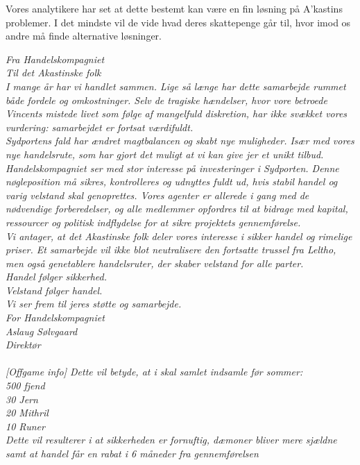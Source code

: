 \documentclass[letterpaper,12pt]{memoir}
\newenvironment{pullquote}
  {\begin{tcolorbox}[enhanced, breakable]\itshape\large}
  {\end{tcolorbox}}
\begin{document}
Vores analytikere har set at dette bestemt kan være en fin løsning på A'kastins problemer. I det mindste vil de vide hvad deres skattepenge går til, hvor imod os andre må finde alternative løsninger.

\begin{pullquote}
Fra Handelskompagniet\\
Til det Akastinske folk\\
I mange år har vi handlet sammen. Lige så længe har dette samarbejde rummet både fordele og omkostninger. Selv de tragiske hændelser, hvor vore betroede Vincents mistede livet som følge af mangelfuld diskretion, har ikke svækket vores vurdering: samarbejdet er fortsat værdifuldt.\\
Sydportens fald har ændret magtbalancen og skabt nye muligheder. Især med vores nye handelsrute, som har gjort det muligt at vi kan give jer et unikt tilbud.\\
Handelskompagniet ser med stor interesse på investeringer i Sydporten. Denne nøgleposition må sikres, kontrolleres og udnyttes fuldt ud, hvis stabil handel og varig velstand skal genoprettes. Vores agenter er allerede i gang med de nødvendige forberedelser, og alle medlemmer opfordres til at bidrage med kapital, ressourcer og politisk indflydelse for at sikre projektets gennemførelse.\\
Vi antager, at det Akastinske folk deler vores interesse i sikker handel og rimelige priser. Et samarbejde vil ikke blot neutralisere den fortsatte trussel fra Leltho, men også genetablere handelsruter, der skaber velstand for alle parter.\\
Handel følger sikkerhed.\\
Velstand følger handel.\\
Vi ser frem til jeres støtte og samarbejde.\\
For Handelskompagniet\\
 Aslaug Sølvgaard\\
 Direktør\\\\[3\baselineskip]
[Offgame info] Dette vil betyde, at i skal samlet indsamle før sommer: \\
500 fjend \\
30 Jern \\
20 Mithril \\
10 Runer \\
Dette vil resulterer i at sikkerheden er fornuftig, dæmoner bliver mere sjældne samt at handel får en rabat i 6 måneder fra gennemførelsen  
\end{pullquote}
\end{document}
